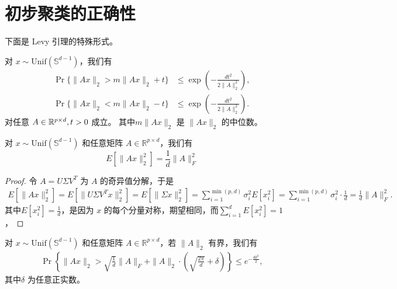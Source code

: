 \documentclass{ctexart}
\begin{document}
\section{初步聚类的正确性}\label{sec:proof_greedy}
下面是 Levy 引理的特殊形式。
\begin{lemma} \label{lem:measureconc}
对 $x \sim \text{Unif}(\mathbb{S}^{d-1})$，我们有
\begin{align*} 
\Pr \{ \| A x \|_2  > m\|A x\|_2 + t \} &\le \exp \left( - \frac{dt^2}{2\|A\|_2^2} \right), \\
\Pr \{ \| A x \|_2  < m\|A x\|_2 - t \} &\le \exp \left( - \frac{dt^2}{2\|A\|_2^2} \right).
\end{align*}
对任意 $A \in \mathbb{R}^{p \times d}, t > 0$ 成立。 其中$m\|Ax\|_2$ 是 $\|Ax\|_2$ 的中位数。
\end{lemma}

\begin{lemma} \label{lem:expectation}
  对 $x \sim \text{Unif}(\mathbb{S}^{d-1})$ 和任意矩阵 
  $A \in \mathbb{R}^{p \times d}$，我们有
  $$ E[\|Ax\|_2^2] = \frac{1}{d} \|A\|_F^2 $$
\end{lemma}

\begin{proof}
令 $A = U \Sigma V^T$ 为 $A$ 的奇异值分解，于是
\begin{align*}
  E[\|Ax\|_2^2] = E[\|U \Sigma V^T x\|_2^2] 
  = E[\|\Sigma x\|_2^2] = \sum_{i=1}^{\min(p,d)} \sigma_i^2 E[x_i^2] 
  = \sum_{i=1}^{\min(p,d)} \sigma_i^2 \cdot \frac{1}{d} = \frac{1}{d} \|A\|_F^2.
\end{align*}
其中$ E[x_i^2] = \frac{1}{d}$，是因为 $x$ 的每个分量对称，期望相同，而$ \sum_{i=1}^d E[x_i^2] = 1 $，
\end{proof}

\begin{lemma} \label{lem:subspace_concentration}
  对 $x \sim \text{Unif}(\mathbb{S}^{d-1})$ 和任意矩阵 
  $A \in \mathbb{R}^{p \times d}$，若 $\|A\|_2$ 有界，我们有
  \begin{align*}
    \Pr \left\{ \|A x\|_2 > \sqrt{\frac{1}{d}} \|A\|_F + 
    \|A\|_2 \cdot \left( \sqrt{\frac{2\pi}{d}} + \delta \right) \right\}
    \le e^{-\frac{d \delta^2}{2}},
  \end{align*}
  其中$\delta$ 为任意正实数。
\end{lemma}
\end{document}
